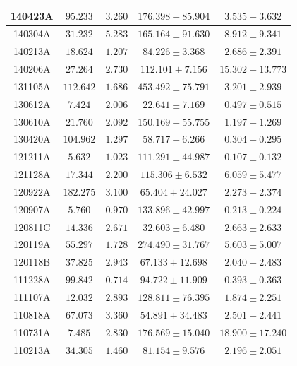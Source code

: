 \begin{longtable}{|c|c|c|c|c|}
\hline
140423A & $  95.233 $ & $ 3.260 $ & $ 176.398 \pm  85.904 $ & $  3.535 \pm  3.632 $ \\
\hline
140304A & $  31.232 $ & $ 5.283 $ & $ 165.164 \pm  91.630 $ & $  8.912 \pm  9.341 $ \\
\hline
140213A & $  18.624 $ & $ 1.207 $ & $  84.226 \pm   3.368 $ & $  2.686 \pm  2.391 $ \\
\hline
140206A & $  27.264 $ & $ 2.730 $ & $ 112.101 \pm   7.156 $ & $ 15.302 \pm 13.773 $ \\
\hline
131105A & $ 112.642 $ & $ 1.686 $ & $ 453.492 \pm  75.791 $ & $  3.201 \pm  2.939 $ \\
\hline
130612A & $   7.424 $ & $ 2.006 $ & $  22.641 \pm   7.169 $ & $  0.497 \pm  0.515 $ \\
\hline
130610A & $   21.760 $ & $ 2.092 $ & $ 150.169 \pm  55.755 $ & $  1.197 \pm  1.269 $ \\
\hline
130420A & $ 104.962 $ & $ 1.297 $ & $  58.717 \pm   6.266 $ & $  0.304 \pm  0.295 $ \\
\hline
121211A & $   5.632 $ & $ 1.023 $ & $ 111.291 \pm  44.987 $ & $  0.107 \pm  0.132 $ \\
\hline
121128A & $  17.344 $ & $ 2.200 $ & $ 115.306 \pm   6.532 $ & $  6.059 \pm  5.477 $ \\
\hline
120922A & $ 182.275 $ & $ 3.100 $ & $  65.404 \pm  24.027 $ & $  2.273 \pm  2.374 $ \\
\hline
120907A & $   5.760 $ & $ 0.970 $ & $ 133.896 \pm  42.997 $ & $  0.213 \pm  0.224 $ \\
\hline
120811C & $  14.336 $ & $ 2.671 $ & $  32.603 \pm   6.480 $ & $  2.663 \pm  2.633 $ \\
\hline
120119A & $  55.297 $ & $ 1.728 $ & $ 274.490 \pm  31.767 $ & $  5.603 \pm  5.007 $ \\
\hline
120118B & $  37.825 $ & $ 2.943 $ & $  67.133 \pm  12.698 $ & $  2.040 \pm  2.483 $ \\
\hline
111228A & $  99.842 $ & $ 0.714 $ & $  94.722 \pm  11.909 $ & $  0.393 \pm  0.363 $ \\
\hline
111107A & $  12.032 $ & $ 2.893 $ & $ 128.811 \pm  76.395 $ & $  1.874 \pm  2.251 $ \\
\hline
110818A & $  67.073 $ & $ 3.360 $ & $  54.891 \pm  34.483 $ & $  2.501 \pm  2.441 $ \\
\hline
110731A & $   7.485 $ & $ 2.830 $ & $ 176.569 \pm  15.040 $ & $ 18.900 \pm 17.240 $ \\
\hline
110213A & $  34.305 $ & $ 1.460 $ & $  81.154 \pm   9.576 $ & $  2.196 \pm  2.051 $ \\

\end{longtable}
